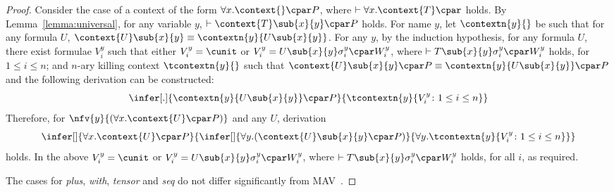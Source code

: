 \documentclass[UKenglish,acmsmall,authorversion]{acmart}
\theoremstyle{plain}
\begin{document}
\begin{proof}

Consider the case of a context of the form $\forall x. \context{ } \cpar P$, where $\vdash \forall x. \context{ T } \cpar$ holds. By Lemma~\ref{lemma:universal}, for any variable $y$, $\vdash \context{ T } \sub{x}{y} \cpar P$ holds.
%
For name $y$, let $\contextn{y}{}$ be such that for any formula $U$, $\context{U} \sub{x}{y} \equiv \contextn{y}{U\sub{x}{y}}$.
%
For any $y$, by the induction hypothesis, for any formula $U$, there exist formulae $V^y_i$ such that either $V^y_i = \cunit$ or $V^y_i = U\sub{x}{y}\sigma^y_i \cpar W^y_i$, where $\vdash T\sub{x}{y}\sigma^y_i \cpar W^y_i$ holds, for $1 \leq i \leq n$; and $n$-ary killing context $\tcontextn{y}{}$ such that 
$
\context{ U } \sub{x}{y} \cpar P
\equiv
\contextn{y}{ U \sub{x}{y}}  \cpar P$
and the following derivation can be constructed:
\[
\infer[.]{
\contextn{y}{ U \sub{x}{y}}  \cpar P
}{
\tcontextn{y}{ V^{y}_i \colon 1 \leq i \leq n  }
}
\]
Therefore, for  $\nfv{y}{(\forall x. \context{ U } \cpar P)}$ and any $U$,
derivation
\[
\infer[]{
\forall x. \context{ U } \cpar P
}{
\infer[]{
\mathopen{\forall y.} \left(\context{ U } \sub{x}{y} \cpar P \right)
}{
\forall y. \tcontextn{y}{ V^{y}_i \colon 1 \leq i \leq n }
}}
\] 
holds.
In the above $V^{y}_i = \cunit$ or $V^y_i = U\sub{x}{y}\sigma^y_i \cpar W^y_i$, where $\vdash T\sub{x}{y}\sigma^y_i \cpar W^y_i$ holds, for all $i$, as required.

The cases for \textit{plus}, \textit{with}, \textit{tensor} and \textit{seq} do not differ significantly from \textsf{MAV}~\cite{Horne2015}.
\end{proof}
\end{document}
